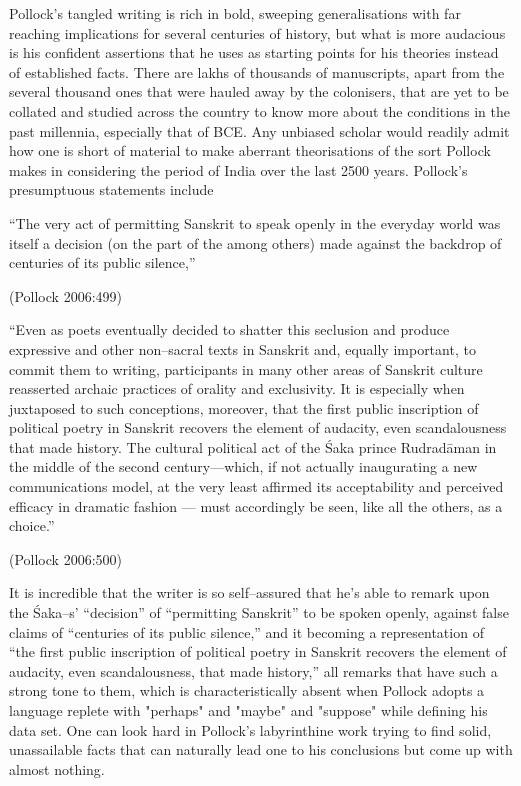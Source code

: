 Pollock’s tangled writing is rich in bold, sweeping generalisations with far reaching implications for several centuries of history, but what is more audacious is his confident assertions that he uses as starting points for his theories instead of established facts. There are lakhs of thousands of manuscripts, apart from the several thousand ones that were hauled away by the colonisers, that are yet to be collated and studied across the country to know more about the conditions in the past millennia, especially that of BCE. Any unbiased scholar would readily admit how one is short of material to make aberrant theorisations of the sort Pollock makes in considering the period of India over the last 2500 years. Pollock’s presumptuous statements include

\begin{myquote}
“The very act of permitting Sanskrit to speak openly in the everyday world was itself a decision (on the part of the among others) made against the backdrop of centuries of its public silence,”
\end{myquote}

\hfill (Pollock 2006:499)

\begin{myquote}
“Even as poets eventually decided to shatter this seclusion and produce expressive and other non–sacral texts in Sanskrit and, equally important, to commit them to writing, participants in many other areas of Sanskrit culture reasserted archaic practices of orality and exclusivity. It is especially when juxtaposed to such conceptions, moreover, that the first public inscription of political poetry in Sanskrit recovers the element of audacity, even scandalousness that made history. The cultural political act of the Śaka prince Rudradāman in the middle of the second century—which, if not actually inaugurating a new communications model, at the very least affirmed its acceptability and perceived efficacy in dramatic fashion — must accordingly be seen, like all the others, as a choice.”
\end{myquote}

\hfill (Pollock 2006:500)

It is incredible that the writer is so self–assured that he’s able to remark upon the Śaka–s' “decision” of “permitting Sanskrit” to be spoken openly, against false claims of “centuries of its public silence,” and it becoming a representation of “the first public inscription of political poetry in Sanskrit recovers the element of audacity, even scandalousness, that made history,” all remarks that have such a strong tone to them, which is characteristically absent when Pollock adopts a language replete with "perhaps" and "maybe" and "suppose" while defining his data set. One can look hard in Pollock’s labyrinthine work trying to find solid, unassailable facts that can naturally lead one to his conclusions but come up with almost nothing.

